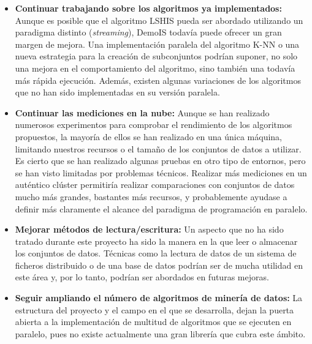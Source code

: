 \begin{itemize}
\item \textbf{Continuar trabajando sobre los algoritmos ya implementados:} Aunque es posible que el algoritmo LSHIS pueda ser abordado utilizando un paradigma distinto (\textit{streaming}), DemoIS todavía puede ofrecer un gran margen de mejora. Una implementación paralela del algoritmo K-NN o una nueva estrategia para la creación de subconjuntos podrían suponer, no solo una mejora en el comportamiento del algoritmo, sino también una todavía más rápida ejecución. Además, existen algunas variaciones de los algoritmos que no han sido implementadas en su versión paralela.

\item \textbf{Continuar las mediciones en la nube:} Aunque se han realizado numerosos experimentos para comprobar el rendimiento de los algoritmos propuestos, la mayoría de ellos se han realizado en una única máquina, limitando nuestros recursos o el tamaño de los conjuntos de datos a utilizar. Es cierto que se han realizado algunas pruebas en otro tipo de entornos, pero se han visto limitadas por problemas técnicos. Realizar más mediciones en un auténtico clúster permitiría realizar comparaciones con conjuntos de datos mucho más grandes, bastantes más recursos, y probablemente ayudase a definir más claramente el alcance del paradigma de programación en paralelo.

\item \textbf{Mejorar métodos de lectura/escritura:} Un aspecto que no ha sido tratado durante este proyecto ha sido la manera en la que leer o almacenar los conjuntos de datos. Técnicas como la lectura de datos de un sistema de ficheros distribuido o de una base de datos podrían ser de mucha utilidad en este área y, por lo tanto, podrían ser abordados en futuras mejoras.

\item \textbf{Seguir ampliando el número de algoritmos de minería de datos:} La estructura del proyecto y el campo en el que se desarrolla, dejan la puerta abierta a la implementación de multitud de algoritmos que se ejecuten en paralelo, pues no existe actualmente una gran librería que cubra este ámbito.


\end{itemize}



